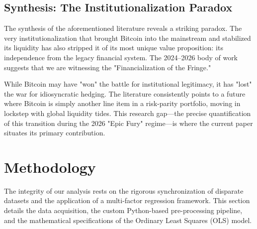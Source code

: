 \documentclass[10pt, conference, compsocconf]{IEEEtran}
\begin{document}

\subsection{Synthesis: The Institutionalization Paradox}

The synthesis of the aforementioned literature reveals a striking paradox. The very institutionalization that brought Bitcoin into the mainstream and stabilized its liquidity has also stripped it of its most unique value proposition: its independence from the legacy financial system. The 2024--2026 body of work suggests that we are witnessing the "Financialization of the Fringe." 

While Bitcoin may have "won" the battle for institutional legitimacy, it has "lost" the war for idiosyncratic hedging. The literature consistently points to a future where Bitcoin is simply another line item in a risk-parity portfolio, moving in lockstep with global liquidity tides. This research gap—the precise quantification of this transition during the 2026 "Epic Fury" regime—is where the current paper situates its primary contribution.


\section{Methodology}

The integrity of our analysis rests on the rigorous synchronization of disparate datasets and the application of a multi-factor regression framework. This section details the data acquisition, the custom Python-based pre-processing pipeline, and the mathematical specifications of the Ordinary Least Squares (OLS) model.

\end{document}
